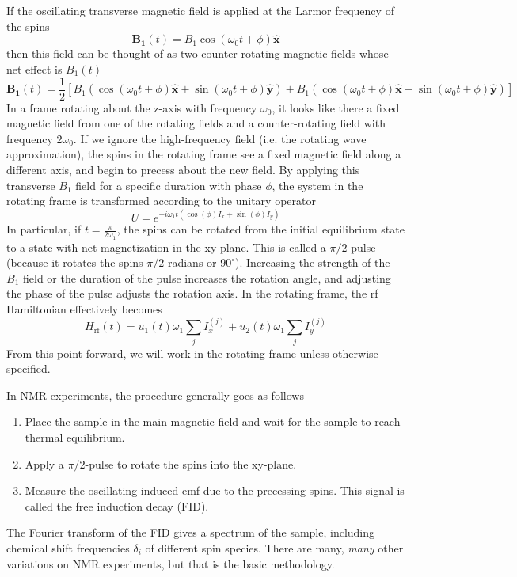 If the oscillating transverse magnetic field is applied at the Larmor frequency of the spins
\[
\mathbf{B_1}(t) = B_1 \cos(\omega_0 t + \phi) \mathbf{\hat{x}}
\]
then this field can be thought of as two counter-rotating magnetic fields whose net effect is $B_1(t)$
\[
\mathbf{B_1}(t) = \frac{1}{2} \left[
    B_1 (\cos(\omega_0 t + \phi) \mathbf{\hat{x}} + \sin(\omega_0 t + \phi) \mathbf{\hat{y}}) +
    B_1 (\cos(\omega_0 t + \phi) \mathbf{\hat{x}} - \sin(\omega_0 t + \phi) \mathbf{\hat{y}})
\right]
\]
In a frame rotating about the z-axis with frequency $\omega_0$, it looks like there a fixed magnetic field from one of the rotating fields and a counter-rotating field with frequency $2\omega_0$. If we ignore the high-frequency field (i.e. the rotating wave approximation), the spins in the rotating frame see a fixed magnetic field along a different axis, and begin to precess about the new field.
By applying this transverse $B_1$ field for a specific duration with phase $\phi$, the system in the rotating frame is transformed according to the unitary operator
\[
U = e^{-i \omega_1 t (\cos(\phi) I_x + \sin(\phi) I_y)}
\]
In particular, if $t = \frac{\pi}{2 \omega_1}$, the spins can be rotated from the initial equilibrium state to a state with net magnetization in the xy-plane. This is called a $\pi/2$-pulse (because it rotates the spins $\pi/2$ radians or $90^\circ$). Increasing the strength of the $B_1$ field or the duration of the pulse increases the rotation angle, and adjusting the phase of the pulse adjusts the rotation axis. In the rotating frame, the rf Hamiltonian effectively becomes
\[
H_{\text{rf}}(t) = u_1(t) \omega_1 \sum_j I_x^{(j)} + u_2(t) \omega_1 \sum_j I_y^{(j)}
\]
From this point forward, we will work in the rotating frame unless otherwise specified.

In NMR experiments, the procedure generally goes as follows
\begin{enumerate}
    \item Place the sample in the main magnetic field and wait for the sample to reach thermal equilibrium.
    \item Apply a $\pi/2$-pulse to rotate the spins into the xy-plane.
    \item Measure the oscillating induced emf due to the precessing spins. This signal is called the free induction decay (FID).
\end{enumerate}
The Fourier transform of the FID gives a spectrum of the sample, including chemical shift frequencies $\delta_i$ of different spin species. There are many, \emph{many} other variations on NMR experiments, but that is the basic methodology.

